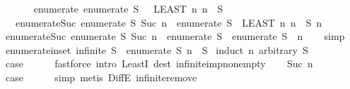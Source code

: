 \begin{isabellebody}
\ \ \isanewline
\ \ \ \ enumerate{\isacharunderscore}{}{\isacharcolon}\ {\isachardoublequoteopen}enumerate\ S\ {}\ {\isacharequal}\ {\isacharparenleft}LEAST\ n{\isachardot}\ n\ {\isasymin}\ S{\isacharparenright}{\isachardoublequoteclose}\isanewline
\ \ {\isacharbar}\ enumerate{\isacharunderscore}Suc{\isacharcolon}\ {\isachardoublequoteopen}enumerate\ S\ {\isacharparenleft}Suc\ n{\isacharparenright}\ {\isacharequal}\ enumerate\ {\isacharparenleft}S\ {\isacharminus}\ {\isacharbraceleft}LEAST\ n{\isachardot}\ n\ {\isasymin}\ S{\isacharbraceright}{\isacharparenright}\ n{\isachardoublequoteclose}\isanewline
\isanewline
{}\isamarkupfalse%
\ enumerate{\isacharunderscore}Suc{\isacharprime}{\isacharcolon}\ {\isachardoublequoteopen}enumerate\ S\ {\isacharparenleft}Suc\ n{\isacharparenright}\ {\isacharequal}\ enumerate\ {\isacharparenleft}S\ {\isacharminus}\ {\isacharbraceleft}enumerate\ S\ {}{\isacharbraceright}{\isacharparenright}\ n{\isachardoublequoteclose}\isanewline
%
\isadelimproof
\ \ %
\endisadelimproof
%
\isatagproof
{}\isamarkupfalse%
\ simp%
\endisatagproof
{\isafoldproof}%
%
\isadelimproof
\isanewline
%
\endisadelimproof
\isanewline
{}\isamarkupfalse%
\ enumerate{\isacharunderscore}in{\isacharunderscore}set{\isacharcolon}\ {\isachardoublequoteopen}infinite\ S\ {\isasymLongrightarrow}\ enumerate\ S\ n\ {\isasymin}\ S{\isachardoublequoteclose}\isanewline
%
\isadelimproof
%
\endisadelimproof
%
\isatagproof
{}\isamarkupfalse%
\ {\isacharparenleft}induct\ n\ arbitrary{\isacharcolon}\ S{\isacharparenright}\isanewline
\ \ \isamarkupfalse%
\ {}\isanewline
\ \ \isamarkupfalse%
\ \isamarkupfalse%
\ {\isacharquery}case\isanewline
\ \ \ \ \isamarkupfalse%
\ {\isacharparenleft}fastforce\ intro{\isacharcolon}\ LeastI\ dest{\isacharbang}{\isacharcolon}\ infinite{\isacharunderscore}imp{\isacharunderscore}nonempty{\isacharparenright}\isanewline
{}\isamarkupfalse%
\isanewline
\ \ \isamarkupfalse%
\ {\isacharparenleft}Suc\ n{\isacharparenright}\isanewline
\ \ \isamarkupfalse%
\ \isamarkupfalse%
\ {\isacharquery}case\isanewline
\ \ \ \ \isamarkupfalse%
\ simp\ {\isacharparenleft}metis\ DiffE\ infinite{\isacharunderscore}remove{\isacharparenright}\isanewline
{}\isamarkupfalse%
%
\endisatagproof
{\isafoldproof}%
%
\isadelimproof
\isanewline
%
\endisadelimproof
\isanewline
{}\isamarkupfalse%

\end{isabellebody}
